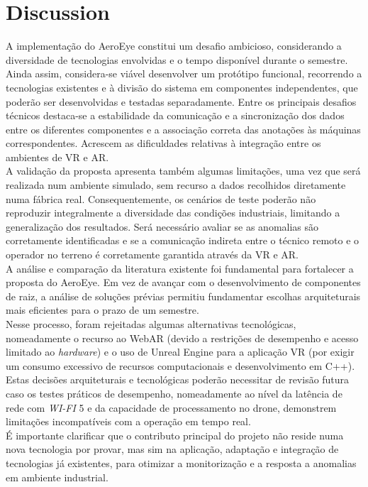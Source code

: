\documentclass[conference,a4paper]{IEEEtran}
\begin{document}
\section{Discussion}
A implementação do AeroEye constitui um desafio ambicioso, considerando a diversidade de tecnologias envolvidas e o tempo disponível durante o semestre. Ainda assim, considera-se viável desenvolver um protótipo funcional, recorrendo a tecnologias existentes e à divisão do sistema em componentes independentes, que poderão ser desenvolvidas e testadas separadamente. Entre os principais desafios técnicos destaca-se a estabilidade da comunicação e a sincronização dos dados entre os diferentes componentes e a associação correta das anotações às máquinas correspondentes. Acrescem as dificuldades relativas à integração entre os ambientes de VR e AR.\\
A validação da proposta apresenta também algumas limitações, uma vez que será realizada num ambiente simulado, sem recurso a dados recolhidos diretamente numa fábrica real. Consequentemente, os cenários de teste poderão não reproduzir integralmente a diversidade das condições industriais, limitando a generalização dos resultados. Será necessário avaliar se as anomalias são corretamente identificadas e se a comunicação indireta entre o técnico remoto e o operador no terreno é corretamente garantida através da VR e AR.\\
A análise e comparação da literatura existente foi fundamental para fortalecer a proposta do AeroEye. Em vez de avançar com o desenvolvimento de componentes de raiz, a análise de soluções prévias permitiu fundamentar escolhas arquiteturais mais eficientes para o prazo de um semestre.\\
Nesse processo, foram rejeitadas algumas alternativas tecnológicas, nomeadamente o recurso ao WebAR (devido a restrições de desempenho e acesso limitado ao \textit{hardware}) e o uso de Unreal Engine para a aplicação VR (por exigir um consumo excessivo de recursos computacionais e desenvolvimento em C++). Estas decisões arquiteturais e tecnológicas poderão necessitar de revisão futura caso os testes práticos de desempenho, nomeadamente ao nível da latência de rede com \textit{WI-FI} 5 e da capacidade de processamento no drone, demonstrem limitações incompatíveis com a operação em tempo real.\\
É importante clarificar que o contributo principal do projeto não reside numa nova tecnologia por provar, mas sim na aplicação, adaptação e integração de tecnologias já existentes, para otimizar a monitorização e a resposta a anomalias em ambiente industrial.
\end{document}

